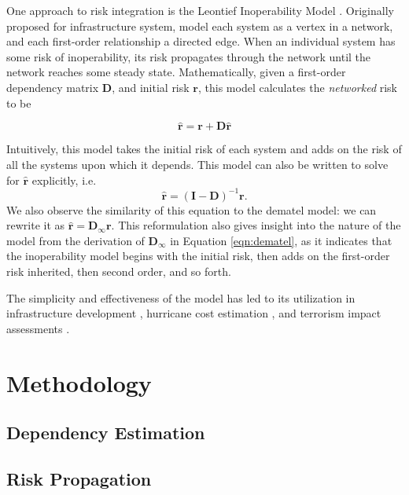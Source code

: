 \documentclass{article}
\begin{document}
One approach to risk integration is the Leontief Inoperability Model \citep{haimes-iiom}. Originally proposed for infrastructure system, \citeauthor{haimes-iiom} model each system as a vertex in a network, and each first-order relationship a directed edge. When an individual system has some risk of inoperability, its risk propagates through the network until the network reaches some steady state. Mathematically, given a first-order dependency matrix $\mathbf{D}$, and initial risk $\mathbf{r}$, this model calculates the \emph{networked} risk to be 

\begin{equation}
\hat{\mathbf{r}} = \mathbf{r} + \mathbf{D} \hat{\mathbf{r}}
\end{equation}

Intuitively, this model takes the initial risk of each system and adds on the risk of all the systems upon which it depends. This model can also be written to solve for $\hat{\mathbf{r}}$ explicitly, i.e. 
\begin{equation}
\label{eqn:lin}
\hat{\mathbf{r}} = (\mathbf{I}-\mathbf{D})^{-1} \mathbf{r}.
\end{equation}
We also observe the similarity of this equation to the \ac{dematel} model: we can rewrite it as $\hat{\mathbf{r}} = \mathbf{D}_\infty \mathbf{r}$. This reformulation also gives insight into the nature of the model from the derivation of $\mathbf{D}_\infty$ in Equation \ref{eqn:dematel}, as it indicates that the inoperability model begins with the initial risk, then adds on the first-order risk inherited, then second order, and so forth.

The simplicity and effectiveness of the \citeauthor{haimes-iiom} model has led to its utilization in infrastructure development \citep{iiom-infrastructure}, hurricane cost estimation \citep{iiom-katrina}, and terrorism impact assessments \citep{iiom-terrorism}. 

\section{Methodology}

\subsection{Dependency Estimation}


\subsection{Risk Propagation}
\end{document}
